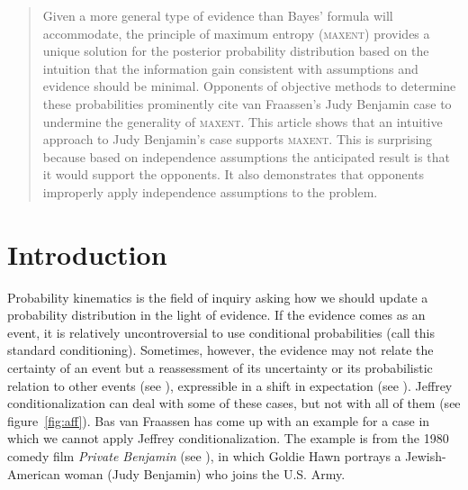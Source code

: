 \documentclass[12pt]{article}
\begin{document}
\begin{abstract}
  \noindent Given a more general type of evidence than Bayes' formula
  will accommodate, the principle of maximum entropy (\textsc{maxent})
  provides a unique solution for the posterior probability
  distribution based on the intuition that the information gain
  consistent with assumptions and evidence should be minimal.
  Opponents of objective methods to determine these probabilities
  prominently cite van Fraassen's Judy Benjamin case to undermine the
  generality of \textsc{maxent}. This article shows that an intuitive
  approach to Judy Benjamin's case supports \textsc{maxent}. This is
  surprising because based on independence assumptions the anticipated
  result is that it would support the opponents. It also demonstrates
  that opponents improperly apply independence assumptions to the
  problem.
\end{abstract}

\section{Introduction}
\label{Introduction}

Probability kinematics is the field of inquiry asking how we should
update a probability distribution in the light of evidence. If the
evidence comes as an event, it is relatively uncontroversial to use
conditional probabilities (call this standard conditioning).
Sometimes, however, the evidence may not relate the certainty of an
event but a reassessment of its uncertainty or its probabilistic
relation to other events (see ),
expressible in a shift in expectation (see ).
Jeffrey conditionalization can deal with some of these cases, but not
with all of them (see figure~\ref{fig:aff}). Bas van Fraassen has come
up with an example for a case in which we cannot apply Jeffrey
conditionalization. The example is from the 1980 comedy film
\emph{Private Benjamin} (see )\nonsc{}, in
which Goldie Hawn portrays a Jewish-American woman (Judy Benjamin) who
joins the U.S. Army.
\end{document}
